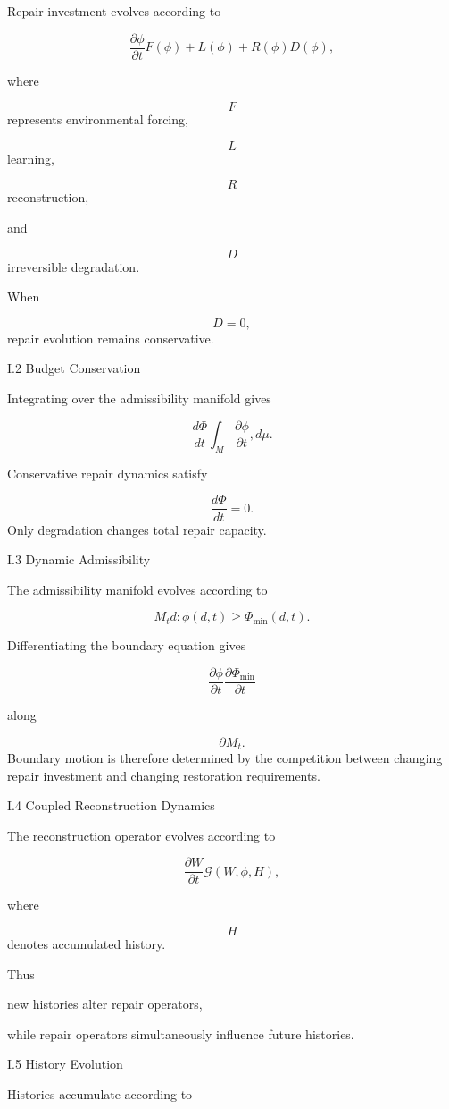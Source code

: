\documentclass[12pt,oneside]{article}
\theoremstyle{plain}
\theoremstyle{definition}
\theoremstyle{remark}
\begin{document}
Repair investment evolves according to

\[
\frac{\partial\phi}{\partial t}
F(\phi)
+
L(\phi)
+
R(\phi)

D(\phi),
\]

where

\[
F
\]
represents environmental forcing,

\[
L
\]
learning,

\[
R
\]
reconstruction,

and

\[
D
\]
irreversible degradation.

When

\[
D=0,
\]
repair evolution remains conservative.


I.2 Budget Conservation

Integrating over the admissibility manifold gives

\[
\frac{d\Phi}{dt}
\int_M
\frac{\partial\phi}{\partial t}
,d\mu.
\]

Conservative repair dynamics satisfy

\[
\boxed{
\frac{d\Phi}{dt}=0.
}
\]
Only degradation changes total repair capacity.


I.3 Dynamic Admissibility

The admissibility manifold evolves according to

\[
M_t
{
d:
\phi(d,t)
\ge
\Phi_{\min}(d,t)
}.
\]

Differentiating the boundary equation gives

\[
\frac{\partial\phi}{\partial t}
\frac{\partial\Phi_{\min}}{\partial t}
\]

along

\[
\partial M_t.
\]
Boundary motion is therefore determined by the competition between changing repair investment and changing restoration requirements.


I.4 Coupled Reconstruction Dynamics

The reconstruction operator evolves according to

\[
\frac{\partial W}{\partial t}
\mathcal G(W,\phi,H),
\]

where

\[
H
\]
denotes accumulated history.

Thus

new histories alter repair operators,

while repair operators simultaneously influence future histories.


I.5 History Evolution

Histories accumulate according to
\end{document}

